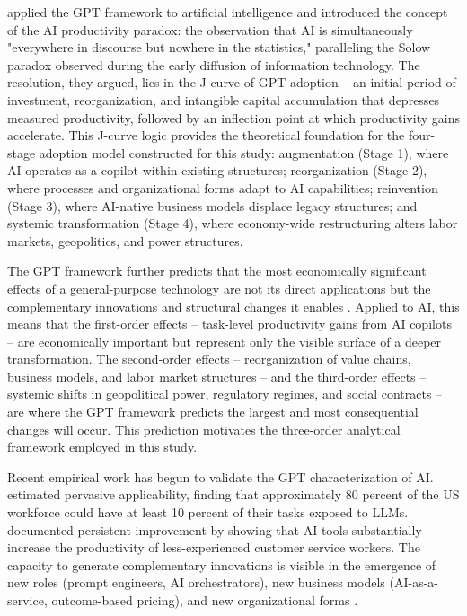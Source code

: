 \documentclass[preprint,review,12pt]{elsarticle}
\begin{document}
\citet{brynjolfsson2017productivity} applied the GPT framework to artificial intelligence and introduced the concept of the AI productivity paradox: the observation that AI is simultaneously "everywhere in discourse but nowhere in the statistics," paralleling the Solow paradox observed during the early diffusion of information technology. The resolution, they argued, lies in the J-curve of GPT adoption -- an initial period of investment, reorganization, and intangible capital accumulation that depresses measured productivity, followed by an inflection point at which productivity gains accelerate. This J-curve logic provides the theoretical foundation for the four-stage adoption model constructed for this study: augmentation (Stage 1), where AI operates as a copilot within existing structures; reorganization (Stage 2), where processes and organizational forms adapt to AI capabilities; reinvention (Stage 3), where AI-native business models displace legacy structures; and systemic transformation (Stage 4), where economy-wide restructuring alters labor markets, geopolitics, and power structures.

The GPT framework further predicts that the most economically significant effects of a general-purpose technology are not its direct applications but the complementary innovations and structural changes it enables \citep{bresnahan1995gpt, korzinov2018gpt, coccia2018longwaves}. Applied to AI, this means that the first-order effects -- task-level productivity gains from AI copilots -- are economically important but represent only the visible surface of a deeper transformation. The second-order effects -- reorganization of value chains, business models, and labor market structures -- and the third-order effects -- systemic shifts in geopolitical power, regulatory regimes, and social contracts -- are where the GPT framework predicts the largest and most consequential changes will occur. This prediction motivates the three-order analytical framework employed in this study.

Recent empirical work has begun to validate the GPT characterization of AI. \citet{eloundou2023gpts} estimated pervasive applicability, finding that approximately 80 percent of the US workforce could have at least 10 percent of their tasks exposed to LLMs. \citet{brynjolfsson2023generative} documented persistent improvement by showing that AI tools substantially increase the productivity of less-experienced customer service workers. The capacity to generate complementary innovations is visible in the emergence of new roles (prompt engineers, AI orchestrators), new business models (AI-as-a-service, outcome-based pricing), and new organizational forms \citep{kanbach2023genai, brown2024theory}.
\end{document}
